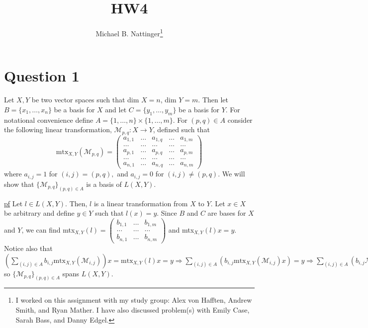\documentclass[11pt]{article} %
\title{HW4}
\author{Michael B. Nattinger\footnote{I worked on this assignment with my study group: Alex von Hafften, Andrew Smith, and Ryan Mather. I have also discussed problem(s) with Emily Case, Sarah Bass, and Danny Edgel.}}
\begin{document}
\maketitle

\section{Question 1}
Let $X,Y$ be two vector spaces such that dim $X = n$, dim $Y = m$. Then let $B = \{ x_1, \dots, x_n\} $ be a basis for $X$ and let $C = \{ y_1, \dots, y_m\}$ be a basis for $Y$. For notational convenience define $A = \{ 1 , \dots, n\} \times \{1, \dots,m \}$. For $(p,q) \in A$ consider the following linear transformation, $\mathcal{M}_{p,q}: X \rightarrow Y$, defined such that 
\begin{equation*}
\text{mtx}_{X,Y}(\mathcal{M}_{p,q}) = \begin{pmatrix}a_{1,1} & \dots  & a_{1,q} & \dots & a_{1,m} \\ \dots & \dots & \dots & \dots & \dots \\ a_{p,1} & \dots  & a_{p,q} & \dots & a_{p,m} \\ \dots & \dots & \dots & \dots & \dots \\ a_{n,1} & \dots  & a_{n,q} & \dots & a_{n,m} \end{pmatrix}
\end{equation*}
 where $a_{i,j} = 1$ for $(i,j) = (p,q),$ and $a_{i,j} = 0$ for $(i,j) \neq (p,q)$. We will show that $\{ \mathcal{M}_{p,q} \}_{(p,q) \in A}$ is a basis of $L(X,Y).$

\underline{pf} Let $l \in L(X,Y)$. Then, $l$ is a linear transformation from $X$ to $Y$. Let $x \in X$ be arbitrary and define $y \in Y$ such that $l(x) = y$. Since $B$ and $C$ are bases for $X$ and $Y$, we can find mtx$_{X,Y}(l) = \begin{pmatrix}b_{1,1} & \dots  & b_{1,m} \\ \dots & \dots & \dots \\ b_{n,1} & \dots  & b_{n,m} \end{pmatrix}$ and mtx$_{X,Y}(l) x = y$. Notice also that $\left(\sum_{(i,j) \in A}  b_{i,j} \text{mtx}_{X,Y}(\mathcal{M}_{i,j})  \right) x = \text{mtx}_{X,Y}(l) x =  y \Rightarrow \sum_{(i,j) \in A} \left( b_{i,j} \text{mtx}_{X,Y}(\mathcal{M}_{i,j})  x\right) = y \Rightarrow \sum_{(i,j) \in A} \left( b_{i,j} \mathcal{M}_{i,j}(x)  \right) = y $ so $\{ \mathcal{M}_{p,q} \}_{(p,q) \in A}$ spans $L(X,Y)$.
\end{document}
